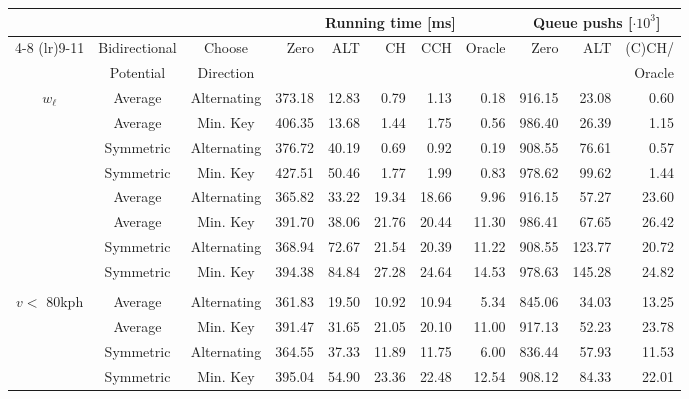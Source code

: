 \begin{tabular}{cccrrrrrrrr}
\toprule
 &  &  & \multicolumn{5}{c}{Running time [ms]} & \multicolumn{3}{c}{Queue pushs [$\cdot 10^3$]} \\ \cmidrule(lr){4-8} \cmidrule(lr){9-11}\multirow{2}{*}{$w_q$} & Bidirectional & Choose    & \multirow{2}{*}{Zero} & \multirow{2}{*}{ALT} & \multirow{2}{*}{CH} & \multirow{2}{*}{CCH} & \multirow{2}{*}{Oracle} & \multirow{2}{*}{Zero} & \multirow{2}{*}{ALT} & (C)CH/ \\
 & Potential     & Direction & & & & & & & & Oracle \\
\midrule
\multirow{4}{*}{$w_{\ell}$} &   Average &               Alternating &            373.18 & 12.83 &  0.79 &  1.13 &   0.18 &                     916.15 &  23.08 &         0.60 \\
           &   Average &                  Min. Key &            406.35 & 13.68 &  1.44 &  1.75 &   0.56 &                     986.40 &  26.39 &         1.15 \\
           & Symmetric &               Alternating &            376.72 & 40.19 &  0.69 &  0.92 &   0.19 &                     908.55 &  76.61 &         0.57 \\
           & Symmetric &                  Min. Key &            427.51 & 50.46 &  1.77 &  1.99 &   0.83 &                     978.62 &  99.62 &         1.44 \\
\addlinespace
     \multirow{4}{*}{$w_{\ell} \cdot 1.05$} &   Average &               Alternating &            365.82 & 33.22 & 19.34 & 18.66 &   9.96 &                     916.15 &  57.27 &        23.60 \\
           &   Average &                  Min. Key &            391.70 & 38.06 & 21.76 & 20.44 &  11.30 &                     986.41 &  67.65 &        26.42 \\
           & Symmetric &               Alternating &            368.94 & 72.67 & 21.54 & 20.39 &  11.22 &                     908.55 & 123.77 &        20.72 \\
           & Symmetric &                  Min. Key &            394.38 & 84.84 & 27.28 & 24.64 &  14.53 &                     978.63 & 145.28 &        24.82 \\
\addlinespace
   \multirow{4}{*}{\shortstack{$w_{\ell} \cdot 1.5$ if\\ $v <$ 80kph}} &   Average &               Alternating &            361.83 & 19.50 & 10.92 & 10.94 &   5.34 &                     845.06 &  34.03 &        13.25 \\
           &   Average &                  Min. Key &            391.47 & 31.65 & 21.05 & 20.10 &  11.00 &                     917.13 &  52.23 &        23.78 \\
           & Symmetric &               Alternating &            364.55 & 37.33 & 11.89 & 11.75 &   6.00 &                     836.44 &  57.93 &        11.53 \\
           & Symmetric &                  Min. Key &            395.04 & 54.90 & 23.36 & 22.48 &  12.54 &                     908.12 &  84.33 &        22.01 \\
\bottomrule
\end{tabular}

